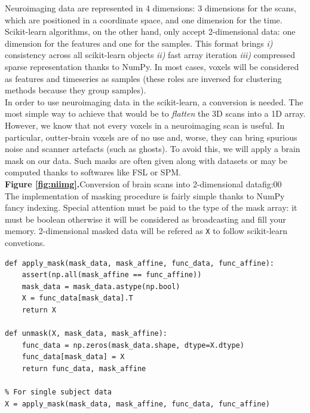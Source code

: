 \documentclass{frontiersSCNS} %
\begin{document}
Neuroimaging data are represented in 4 dimensions: 3 dimensions for the scans,
which are positioned in a coordinate space, and one dimension for the time.
Scikit-learn algorithms, on the other hand, only accept 2-dimensional data: one
dimension for the features and one for the samples. This format brings \textit{i)}
consistency across all scikit-learn objects \textit{ii)} fast array iteration
\textit{iii)} compressed sparse representation thanks to NumPy.
In most
cases, voxels will be considered as features and timeseries as samples (these
roles are inversed for clustering methods because they group samples).\\


In order to use neuroimaging data in the scikit-learn, a
conversion is needed. The most simple way to achieve that would be to
\emph{flatten} the 3D scans into a 1D array. However, we know that not every
voxels in a neuroimaging scan is useful. In particular, outter-brain voxels are
of no use and, worse, they can bring spurious noise and scanner artefacts (such
as ghosts). To avoid this, we will apply a brain mask on our data. Such masks
are often given along with datasets or may be computed thanks to softwares like
FSL or SPM.\\

\textbf{Figure \ref{fig:niimg}.}{Conversion of brain scans into 2-dimensional
data}{fig:00}\\

The implementation of masking procedure is fairly simple thanks to NumPy fancy
indexing. Special attention must be paid to the type of the mask array: it must
be boolean otherwise it will be considered as broadcasting and fill your memory.
2-dimensional masked data will be refered as \texttt{X} to follow scikit-learn
convetions.

\begin{lstlisting}
def apply_mask(mask_data, mask_affine, func_data, func_affine):
    assert(np.all(mask_affine == func_affine))
    mask_data = mask_data.astype(np.bool)
    X = func_data[mask_data].T
    return X

def unmask(X, mask_data, mask_affine):
    func_data = np.zeros(mask_data.shape, dtype=X.dtype)
    func_data[mask_data] = X
    return func_data, mask_affine

% For single subject data
X = apply_mask(mask_data, mask_affine, func_data, func_affine)
\end{lstlisting}


\end{document}
